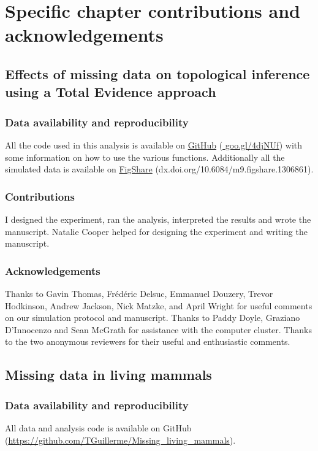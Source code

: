 \chapter*{Specific chapter contributions and acknowledgements} %

\section*{Effects of missing data on topological inference using a Total Evidence approach}
\subsection*{Data availability and reproducibility}
All the code used in this analysis is available on \href{https://github.com/TGuillerme/Total_Evidence_Method-Missing_data}{GitHub} (\href{https://github.com/TGuillerme/Total_Evidence_Method-Missing_data}{    
goo.gl/4djNUf}) with some information on how to use the various functions. Additionally all the simulated data is available on \href{http://figshare.com/articles/Effect_of_missing_data_on_topological_inference_using_a_total_evidence_approach/1306861}{FigShare} (dx.doi.org/10.6084/m9.figshare.1306861).
\subsection*{Contributions}
I designed the experiment, ran the analysis, interpreted the results and wrote the manuscript. Natalie Cooper helped for designing the experiment and writing the manuscript.
\subsection*{Acknowledgements}
Thanks to Gavin Thomas, Fr\'{e}d\'{e}ric Delsuc, Emmanuel Douzery, Trevor Hodkinson, Andrew Jackson, Nick Matzke, and April Wright for useful comments on our simulation protocol and manuscript. Thanks to Paddy Doyle, Graziano D'Innocenzo and Sean McGrath for assistance with the computer cluster. Thanks to the two anonymous reviewers for their useful and enthusiastic comments.

\section*{Missing data in living mammals}
\subsection*{Data availability and reproducibility}
All data and analysis code is available on GitHub (\url{https://github.com/TGuillerme/Missing_living_mammals}).
